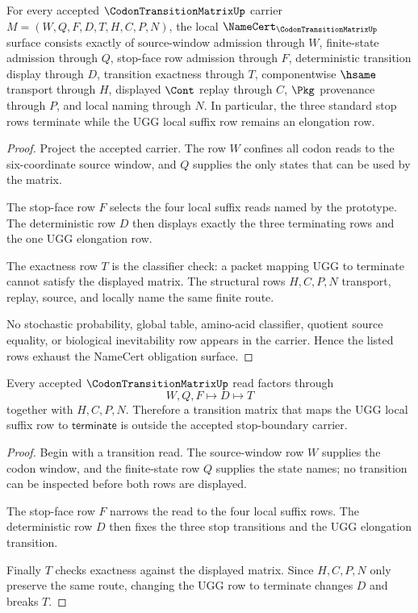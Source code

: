\begin{theorem}
\label{thm:codon-transition-matrix-namecert-obligations}
For every accepted $\CodonTransitionMatrixUp$ carrier $M=(W,Q,F,D,T,H,C,P,N)$, the local $\NameCert_{\CodonTransitionMatrixUp}$ surface consists exactly of source-window admission through $W$, finite-state admission through $Q$, stop-face row admission through $F$, deterministic transition display through $D$, transition exactness through $T$, componentwise $\hsame$ transport through $H$, displayed $\Cont$ replay through $C$, $\Pkg$ provenance through $P$, and local naming through $N$. In particular, the three standard stop rows terminate while the $\mathrm{UGG}$ local suffix row remains an elongation row.
\end{theorem}
\begin{proof}
Project the accepted carrier. The row $W$ confines all codon reads to the six-coordinate source window, and $Q$ supplies the only states that can be used by the matrix.

The stop-face row $F$ selects the four local suffix reads named by the prototype. The deterministic row $D$ then displays exactly the three terminating rows and the one $\mathrm{UGG}$ elongation row.

The exactness row $T$ is the classifier check: a packet mapping $\mathrm{UGG}$ to terminate cannot satisfy the displayed matrix. The structural rows $H,C,P,N$ transport, replay, source, and locally name the same finite route.

No stochastic probability, global table, amino-acid classifier, quotient source equality, or biological inevitability row appears in the carrier. Hence the listed rows exhaust the NameCert obligation surface.
\end{proof}

\begin{theorem}
\label{thm:codon-transition-matrix-stop-boundary-exactness}
Every accepted $\CodonTransitionMatrixUp$ read factors through
$$
W,Q,F \longmapsto D \longmapsto T
$$
together with $H,C,P,N$. Therefore a transition matrix that maps the $\mathrm{UGG}$ local suffix row to $\mathsf{terminate}$ is outside the accepted stop-boundary carrier.
\end{theorem}
\begin{proof}
Begin with a transition read. The source-window row $W$ supplies the codon window, and the finite-state row $Q$ supplies the state names; no transition can be inspected before both rows are displayed.

The stop-face row $F$ narrows the read to the four local suffix rows. The deterministic row $D$ then fixes the three stop transitions and the $\mathrm{UGG}$ elongation transition.

Finally $T$ checks exactness against the displayed matrix. Since $H,C,P,N$ only preserve the same route, changing the $\mathrm{UGG}$ row to terminate changes $D$ and breaks $T$.
\end{proof}

